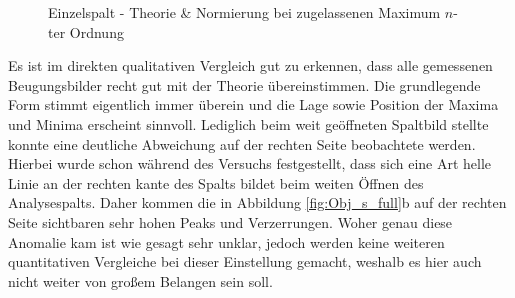 \documentclass{article}
\begin{document}
\begin{figure}[p]
  \hfill
  \hfill
  \hfill
  \hfill
  \caption{Einzelspalt - Theorie \& Normierung bei zugelassenen Maximum $n$-ter Ordnung}
  \label{fig:Obj_s_Theo&Norm}
\end{figure}

\clearpage
\newpage

Es ist im direkten qualitativen Vergleich gut zu erkennen, dass alle gemessenen Beugungsbilder recht gut mit der Theorie übereinstimmen. Die grundlegende Form stimmt eigentlich immer überein und die Lage sowie Position der Maxima und Minima erscheint sinnvoll. Lediglich beim weit geöffneten Spaltbild stellte konnte eine deutliche Abweichung auf der rechten Seite beobachtete werden. Hierbei wurde schon während des Versuchs festgestellt, dass sich eine Art helle Linie an der rechten kante des Spalts bildet beim weiten Öffnen des Analysespalts. Daher kommen die in Abbildung \ref{fig:Obj_s_full}b auf der rechten Seite sichtbaren sehr hohen Peaks und Verzerrungen. Woher genau diese Anomalie kam ist wie gesagt sehr unklar, jedoch werden keine weiteren quantitativen Vergleiche bei dieser Einstellung gemacht, weshalb es hier auch nicht weiter von großem Belangen sein soll.
\end{document}

